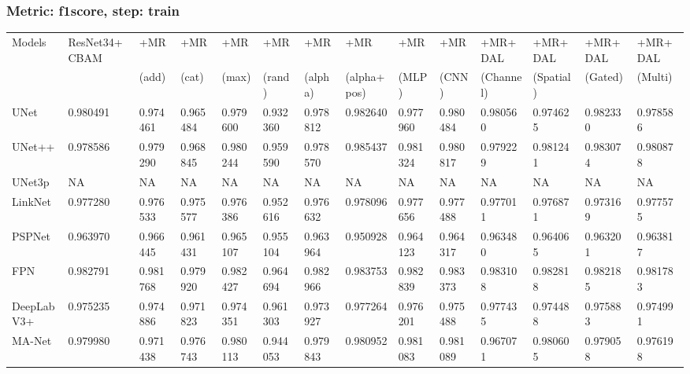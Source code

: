 \documentclass{article}
\begin{document}
\subsubsection{Metric: f1score, step: train}
\begin{tabular}{llllllllllllll}
\toprule
Models & ResNet34+CBAM & +MR  & +MR  & +MR  & +MR  & +MR  & +MR  & +MR  & +MR  & +MR+DAL & +MR+DAL & +MR+DAL & +MR+DAL \\
       &             &  (add) &  (cat) &  (max) &  (rand) &  (alpha) &  (alpha+pos) &  (MLP) &  (CNN) & (Channel) & (Spatial) & (Gated) & (Multi) \\
\midrule
UNet & 0.980491 & 0.974461 & 0.965484 & 0.979600 & 0.932360 & 0.978812 & 0.982640 & 0.977960 & 0.980484 & 0.980560 & 0.974625 & 0.982330 & 0.978586 \\
UNet++ & 0.978586 & 0.979290 & 0.968845 & 0.980244 & 0.959590 & 0.978570 & 0.985437 & 0.981324 & 0.980817 & 0.979229 & 0.981241 & 0.983074 & 0.980878 \\
UNet3p & NA & NA & NA & NA & NA & NA & NA & NA & NA & NA & NA & NA & NA \\
LinkNet & 0.977280 & 0.976533 & 0.975577 & 0.976386 & 0.952616 & 0.976632 & 0.978096 & 0.977656 & 0.977488 & 0.977011 & 0.976871 & 0.973169 & 0.977575 \\
PSPNet & 0.963970 & 0.966445 & 0.961431 & 0.965107 & 0.955104 & 0.963964 & 0.950928 & 0.964123 & 0.964317 & 0.963480 & 0.964065 & 0.963201 & 0.963817 \\
FPN & 0.982791 & 0.981768 & 0.979920 & 0.982427 & 0.964694 & 0.982966 & 0.983753 & 0.982839 & 0.983373 & 0.983108 & 0.982818 & 0.982185 & 0.981783 \\
DeepLabV3+ & 0.975235 & 0.974886 & 0.971823 & 0.974351 & 0.961303 & 0.973927 & 0.977264 & 0.976201 & 0.975488 & 0.977435 & 0.974488 & 0.975883 & 0.974991 \\
MA-Net & 0.979980 & 0.971438 & 0.976743 & 0.980113 & 0.944053 & 0.979843 & 0.980952 & 0.981083 & 0.981089 & 0.967071 & 0.980605 & 0.979058 & 0.976198 \\
\bottomrule
\end{tabular}
\end{document}
